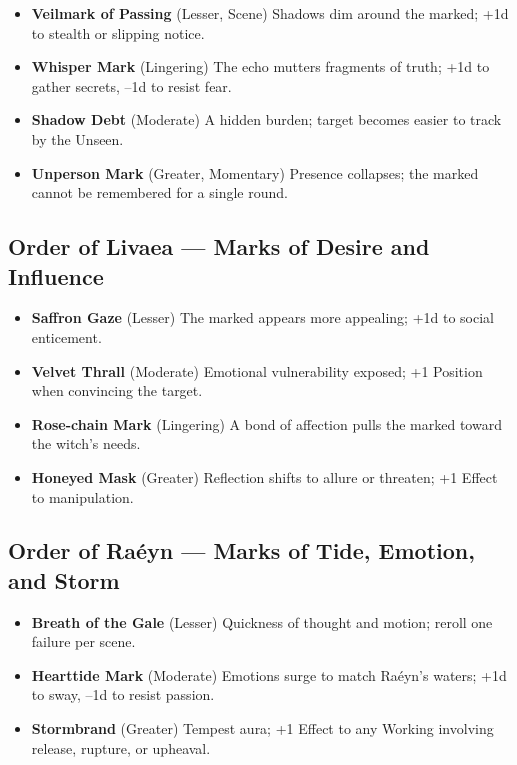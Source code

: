 \documentclass[11pt]{book}
\begin{document}
\begin{itemize}[leftmargin=1.5em]
    \item \textbf{Veilmark of Passing} (Lesser, Scene)  
    Shadows dim around the marked; +1d to stealth or slipping notice.

    \item \textbf{Whisper Mark} (Lingering)  
    The echo mutters fragments of truth; +1d to gather secrets, --1d to resist fear.

    \item \textbf{Shadow Debt} (Moderate)  
    A hidden burden; target becomes easier to track by the Unseen.

    \item \textbf{Unperson Mark} (Greater, Momentary)  
    Presence collapses; the marked cannot be remembered for a single round.
\end{itemize}

\subsection*{Order of Livaea --- Marks of Desire and Influence}

\begin{itemize}[leftmargin=1.5em]
    \item \textbf{Saffron Gaze} (Lesser)  
    The marked appears more appealing; +1d to social enticement.

    \item \textbf{Velvet Thrall} (Moderate)  
    Emotional vulnerability exposed; +1 Position when convincing the target.

    \item \textbf{Rose-chain Mark} (Lingering)  
    A bond of affection pulls the marked toward the witch's needs.

    \item \textbf{Honeyed Mask} (Greater)  
    Reflection shifts to allure or threaten; +1 Effect to manipulation.
\end{itemize}

\subsection*{Order of Raéyn --- Marks of Tide, Emotion, and Storm}

\begin{itemize}[leftmargin=1.5em]
    \item \textbf{Breath of the Gale} (Lesser)  
    Quickness of thought and motion; reroll one failure per scene.

    \item \textbf{Hearttide Mark} (Moderate)  
    Emotions surge to match Raéyn's waters; +1d to sway, --1d to resist passion.

    \item \textbf{Stormbrand} (Greater)  
    Tempest aura; +1 Effect to any Working involving release, rupture, or upheaval.
\end{itemize}
\end{document}
